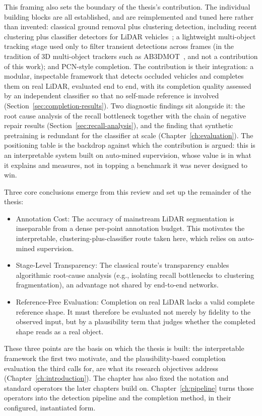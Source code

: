 This framing also sets the boundary of the thesis's contribution. The individual
building blocks are all established, and are reimplemented and tuned here rather than
invented: classical ground removal plus clustering detection, including recent
clustering plus classifier detectors for LiDAR vehicles~\cite{lim2025longrange}; a
lightweight multi-object tracking stage used only to filter transient detections across
frames (in the tradition of 3D multi-object trackers such as
AB3DMOT~\cite{weng2020ab3dmot}, and not a contribution of this work); and PCN-style
completion. The contribution is their integration: a modular, inspectable framework
that detects occluded vehicles and completes them on real
LiDAR, evaluated end to end, with its completion quality assessed by an independent
classifier so that no self-made reference is involved
(Section~\ref{sec:completion-results}). Two diagnostic findings sit alongside it: the
root cause analysis of the recall bottleneck together with the chain of negative repair
results (Section~\ref{sec:recall-analysis}), and the finding that synthetic pretraining is
redundant for the classifier at scale (Chapter~\ref{ch:evaluation}). The positioning table
is the backdrop against which the contribution is argued: this is an interpretable system
built on auto-mined supervision, whose value is in what it explains and measures, not in
topping a benchmark it was never designed to win.

Three core conclusions emerge from this review and set up the remainder of the thesis:

\begin{itemize}
  \item Annotation Cost: The accuracy of mainstream LiDAR segmentation is
    inseparable from a dense per-point annotation budget. This motivates the interpretable,
    clustering-plus-classifier route taken here, which relies on auto-mined supervision.
  \item Stage-Level Transparency: The classical route's transparency enables
    algorithmic root-cause analysis (e.g., isolating recall bottlenecks to clustering
    fragmentation), an advantage not shared by end-to-end networks.
  \item Reference-Free Evaluation: Completion on real LiDAR lacks a valid complete
    reference shape. It must therefore be evaluated not merely by fidelity to the observed
    input, but by a plausibility term that judges whether the completed shape reads as a
    real object.
\end{itemize}

These three points are the basis on which the thesis is built:
the interpretable framework the first two motivate, and the plausibility-based completion
evaluation the third calls for, are what its research objectives address
(Chapter~\ref{ch:introduction}). The chapter has also fixed the notation and standard
operators the later chapters build on. Chapter~\ref{ch:pipeline} turns those operators into
the detection pipeline and the completion method, in their configured, instantiated form.
